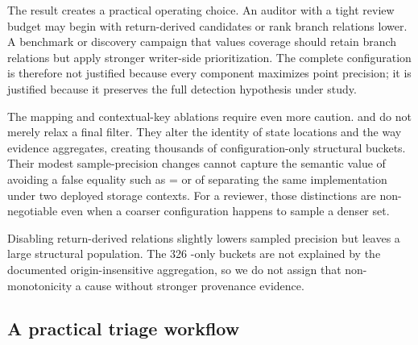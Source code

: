 The result creates a practical operating choice. An auditor with a tight review budget may begin with return-derived candidates or rank branch relations lower. A benchmark or discovery campaign that values coverage should retain branch relations but apply stronger writer-side prioritization. The complete configuration is therefore not justified because every component maximizes point precision; it is justified because it preserves the full detection hypothesis under study.

The mapping and contextual-key ablations require even more caution.  and  do not merely relax a final filter. They alter the identity of state locations and the way evidence aggregates, creating thousands of configuration-only structural buckets. Their modest sample-precision changes cannot capture the semantic value of avoiding a false equality such as  =  or of separating the same implementation under two deployed storage contexts. For a reviewer, those distinctions are non-negotiable even when a coarser configuration happens to sample a denser set.

Disabling return-derived relations slightly lowers sampled precision but leaves a large structural population. The 326 -only buckets are not explained by the documented origin-insensitive aggregation, so we do not assign that non-monotonicity a cause without stronger provenance evidence.

\subsection{A practical triage workflow}
\label{s:discussion-triage}

